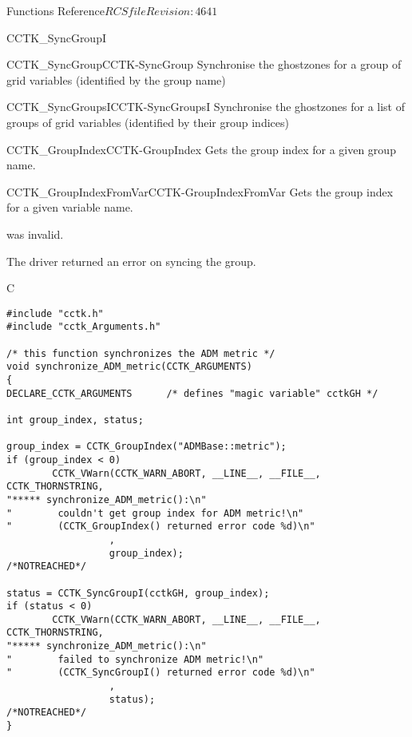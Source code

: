 \begin{cactuspart}{ Functions Reference}{$RCSfile$}{$Revision: 4641 $}
\begin{FunctionDescription}{CCTK\_SyncGroupI}
\begin{SeeAlsoSection}
\begin{SeeAlso2}{CCTK\_SyncGroup}{CCTK-SyncGroup}
Synchronise the ghostzones for a group of grid variables
(identified by the group name)
\end{SeeAlso2}
\begin{SeeAlso2}{CCTK\_SyncGroupsI}{CCTK-SyncGroupsI}
Synchronise the ghostzones for a list of groups of grid variables
(identified by their group indices)
\end{SeeAlso2}
\begin{SeeAlso2}{CCTK\_GroupIndex}{CCTK-GroupIndex}
Gets the group index for a given group name.
\end{SeeAlso2}
\begin{SeeAlso2}{CCTK\_GroupIndexFromVar}{CCTK-GroupIndexFromVar}
Gets the group index for a given variable name.
\end{SeeAlso2}
\end{SeeAlsoSection}

\begin{ErrorSection}
\begin{Error}{-1}
 was invalid.
\end{Error}
\begin{Error}{-2}
The driver returned an error on syncing the group.
\end{Error}
\end{ErrorSection}

\begin{ExampleSection}
\begin{Example}{C}
\begin{verbatim}
#include "cctk.h"
#include "cctk_Arguments.h"

/* this function synchronizes the ADM metric */
void synchronize_ADM_metric(CCTK_ARGUMENTS)
{
DECLARE_CCTK_ARGUMENTS      /* defines "magic variable" cctkGH */

int group_index, status;

group_index = CCTK_GroupIndex("ADMBase::metric");
if (group_index < 0)
        CCTK_VWarn(CCTK_WARN_ABORT, __LINE__, __FILE__, CCTK_THORNSTRING,
"***** synchronize_ADM_metric():\n"
"        couldn't get group index for ADM metric!\n"
"        (CCTK_GroupIndex() returned error code %d)\n"
                  ,
                  group_index);                            /*NOTREACHED*/

status = CCTK_SyncGroupI(cctkGH, group_index);
if (status < 0)
        CCTK_VWarn(CCTK_WARN_ABORT, __LINE__, __FILE__, CCTK_THORNSTRING,
"***** synchronize_ADM_metric():\n"
"        failed to synchronize ADM metric!\n"
"        (CCTK_SyncGroupI() returned error code %d)\n"
                  ,
                  status);                                 /*NOTREACHED*/
}
\end{verbatim}
\end{Example}
\end{ExampleSection}
\end{FunctionDescription}




\end{cactuspart}
